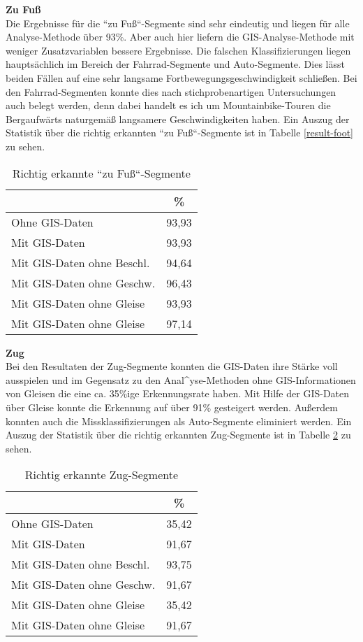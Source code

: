\textbf{Zu Fuß} \\
Die Ergebnisse für die ``zu Fuß``-Segmente sind sehr eindeutig und liegen für alle Analyse-Methode über 93\%.  Aber auch hier liefern die GIS-Analyse-Methode mit weniger Zusatzvariablen bessere Ergebnisse. Die falschen Klassifizierungen liegen hauptsächlich im Bereich der Fahrrad-Segmente und Auto-Segmente. Dies lässt beiden Fällen auf eine sehr langsame Fortbewegungsgeschwindigkeit schließen. Bei den Fahrrad-Segmenten konnte dies nach stichprobenartigen Untersuchungen auch belegt werden, denn dabei handelt es ich um Mountainbike-Touren die Bergaufwärts naturgemäß langsamere Geschwindigkeiten haben. Ein Auszug der Statistik über die richtig erkannten ``zu Fuß``-Segmente ist in Tabelle \ref{result-foot} zu sehen.

\begin{table}[h]
\centering
\begin{tabular}{|l|c|}
\hline
 & \% \\ \hline
Ohne GIS-Daten & 93,93 \\ \hline
Mit GIS-Daten & 93,93 \\ \hline
Mit GIS-Daten ohne Beschl. & 94,64 \\ \hline
Mit GIS-Daten ohne Geschw. & 96,43 \\ \hline
Mit GIS-Daten ohne Gleise & 93,93 \\ \hline
Mit GIS-Daten ohne Gleise & 97,14 \\ \hline
\end{tabular}
\caption{Richtig erkannte ``zu Fuß``-Segmente}
\label{resultat-foot}
\end{table}

\textbf{Zug} \\
Bei den Resultaten der Zug-Segmente konnten die GIS-Daten ihre Stärke voll ausspielen und im Gegensatz zu den Anal^yse-Methoden ohne GIS-Informationen von Gleisen die eine ca. 35\%ige Erkennungsrate haben. Mit Hilfe der GIS-Daten über Gleise konnte die Erkennung auf über 91\% gesteigert werden. Außerdem konnten auch die Missklassifizierungen als Auto-Segmente eliminiert werden. Ein Auszug der Statistik über die richtig erkannten Zug-Segmente ist in Tabelle \ref{result-train} zu sehen.

\begin{table}[h]
\centering
\begin{tabular}{|l|c|}
\hline
 & \% \\ \hline
Ohne GIS-Daten & 35,42 \\ \hline
Mit GIS-Daten & 91,67 \\ \hline
Mit GIS-Daten ohne Beschl. & 93,75 \\ \hline
Mit GIS-Daten ohne Geschw. & 91,67 \\ \hline
Mit GIS-Daten ohne Gleise & 35,42 \\ \hline
Mit GIS-Daten ohne Gleise & 91,67 \\ \hline
\end{tabular}
\caption{Richtig erkannte Zug-Segmente}
\label{result-train}
\end{table}

